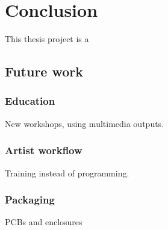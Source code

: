 \chapter{Conclusion}

This thesis project is a

\section{Future work}

\subsection{Education}

New workshops, using multimedia outputs.

\subsection{Artist workflow}

Training instead of programming.

\subsection{Packaging}

PCBs and enclosures
